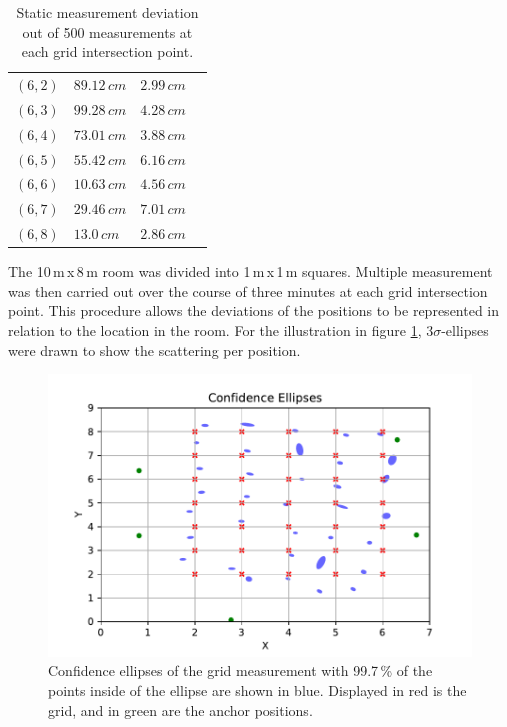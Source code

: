 \documentclass[conference, a4paper]{IEEEtran}
\begin{document}
\begin{table}[hbt!]
\begin{tabular}{l l l c}
		$(6,2)$ & $89.12\,cm$ & $2.99\,cm$\\
		$(6,3)$ & $99.28\,cm$ & $4.28\,cm$\\
		$(6,4)$ & $73.01\,cm$ & $3.88\,cm$\\
		$(6,5)$ & $55.42\,cm$ & $6.16\,cm$\\
		$(6,6)$ & $10.63\,cm$ & $4.56\,cm$\\
		$(6,7)$ & $29.46\,cm$ & $7.01\,cm$\\
		$(6,8)$ & $13.0\,cm$ & $2.86\,cm$\\
		
	\end{tabular}
	\caption{Static measurement deviation out of 500 measurements at each grid intersection point.}
	\label{table:measurements}
\end{table}

The 10\,m\,x\,8\,m room was divided into 1\,m\,x\,1\,m squares. 
Multiple measurement was then carried out over the course of three minutes at each grid intersection point.
This procedure allows the deviations of the positions to be represented in relation to the location in the room.
For the illustration in figure \ref{fig:statistics}, $3\sigma$-ellipses were drawn to show the scattering per position.

\begin{figure}[hbt!]
	\includegraphics[scale=0.63]{pic/position_plot.pdf}
	\caption{Confidence ellipses of the grid measurement with 99.7\,\% of the points inside of the ellipse are shown in blue.
	Displayed in red is the grid, and in green are the anchor positions.}
	\label{fig:statistics}
\end{figure}
\end{document}
